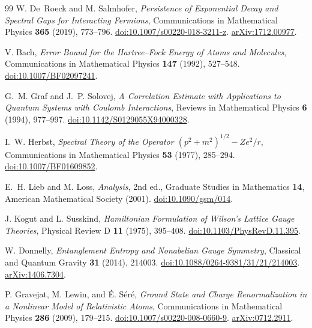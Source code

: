 \begin{thebibliography}{99}
W. De~Roeck and M. Salmhofer,
\emph{Persistence of Exponential Decay and Spectral Gaps for Interacting Fermions},
Communications in Mathematical Physics \textbf{365} (2019), 773--796.
\href{https://doi.org/10.1007/s00220-018-3211-z}{doi:10.1007/s00220-018-3211-z}.
\href{https://arxiv.org/abs/1712.00977}{arXiv:1712.00977}.

V. Bach,
\emph{Error Bound for the Hartree--Fock Energy of Atoms and Molecules},
Communications in Mathematical Physics \textbf{147} (1992), 527--548.
\href{https://doi.org/10.1007/BF02097241}{doi:10.1007/BF02097241}.

G.~M. Graf and J.~P. Solovej,
\emph{A Correlation Estimate with Applications to Quantum Systems with Coulomb Interactions},
Reviews in Mathematical Physics \textbf{6} (1994), 977--997.
\href{https://doi.org/10.1142/S0129055X94000328}{doi:10.1142/S0129055X94000328}.

I.~W. Herbst,
\emph{Spectral Theory of the Operator \((p^2+m^2)^{1/2}-Ze^2/r\)},
Communications in Mathematical Physics \textbf{53} (1977), 285--294.
\href{https://doi.org/10.1007/BF01609852}{doi:10.1007/BF01609852}.

E.~H. Lieb and M. Loss,
\emph{Analysis}, 2nd ed., Graduate Studies in Mathematics \textbf{14},
American Mathematical Society (2001).
\href{https://doi.org/10.1090/gsm/014}{doi:10.1090/gsm/014}.

J. Kogut and L. Susskind,
\emph{Hamiltonian Formulation of Wilson's Lattice Gauge Theories},
Physical Review D \textbf{11} (1975), 395--408.
\href{https://doi.org/10.1103/PhysRevD.11.395}{doi:10.1103/PhysRevD.11.395}.

W. Donnelly,
\emph{Entanglement Entropy and Nonabelian Gauge Symmetry},
Classical and Quantum Gravity \textbf{31} (2014), 214003.
\href{https://doi.org/10.1088/0264-9381/31/21/214003}{doi:10.1088/0264-9381/31/21/214003}.
\href{https://arxiv.org/abs/1406.7304}{arXiv:1406.7304}.

P. Gravejat, M. Lewin, and \'{E}. S\'er\'e,
\emph{Ground State and Charge Renormalization in a Nonlinear Model of Relativistic Atoms},
Communications in Mathematical Physics \textbf{286} (2009), 179--215.
\href{https://doi.org/10.1007/s00220-008-0660-9}{doi:10.1007/s00220-008-0660-9}.
\href{https://arxiv.org/abs/0712.2911}{arXiv:0712.2911}.

\end{thebibliography}
